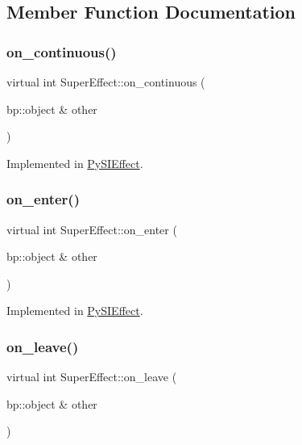 \subsection{Member Function Documentation}
\mbox{\label{class_super_effect_aa94d8221f92a6b045589dc9df4c4d049}} 
\subsubsection{\texorpdfstring{on\_continuous()}{on\_continuous()}}
{\footnotesize\ttfamily virtual int Super\+Effect\+::on\+\_\+continuous (\begin{DoxyParamCaption}\item[{bp\+::object \&}]{other }\end{DoxyParamCaption})\hspace{0.3cm}{\ttfamily [pure virtual]}}



Implemented in \mbox{\hyperlink{class_py_s_i_effect_a21b5ddc6c8b8e54b65618939a708a765}{Py\+S\+I\+Effect}}.

\mbox{\label{class_super_effect_ad742a44d394bcfde1cf8899a33713184}} 
\subsubsection{\texorpdfstring{on\_enter()}{on\_enter()}}
{\footnotesize\ttfamily virtual int Super\+Effect\+::on\+\_\+enter (\begin{DoxyParamCaption}\item[{bp\+::object \&}]{other }\end{DoxyParamCaption})\hspace{0.3cm}{\ttfamily [pure virtual]}}



Implemented in \mbox{\hyperlink{class_py_s_i_effect_aeb22fda0e77d4205ff977c478f97649a}{Py\+S\+I\+Effect}}.

\mbox{\label{class_super_effect_a5f8e89f4930f8f47da22994d0a1b1a61}} 
\subsubsection{\texorpdfstring{on\_leave()}{on\_leave()}}
{\footnotesize\ttfamily virtual int Super\+Effect\+::on\+\_\+leave (\begin{DoxyParamCaption}\item[{bp\+::object \&}]{other }\end{DoxyParamCaption})\hspace{0.3cm}{\ttfamily [pure virtual]}}




